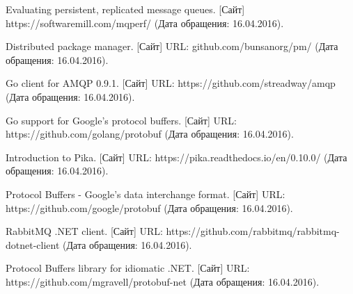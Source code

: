\begin{thebibliography}{9}
Evaluating persistent, replicated message queues. [Сайт] https://softwaremill.com/mqperf/ (Дата обращения: 16.04.2016).

Distributed package manager. [Сайт] URL: github.com/bunsanorg/pm/ (Дата обращения: 16.04.2016).

Go client for AMQP 0.9.1. [Сайт] URL: https://github.com/streadway/amqp (Дата обращения: 16.04.2016).

Go support for Google's protocol buffers. [Сайт] URL: https://github.com/golang/protobuf (Дата обращения: 16.04.2016).

Introduction to Pika. [Сайт] URL: https://pika.readthedocs.io/en/0.10.0/ (Дата обращения: 16.04.2016).

Protocol Buffers - Google's data interchange format. [Сайт] URL: https://github.com/google/protobuf (Дата обращения: 16.04.2016).

RabbitMQ .NET client. [Сайт] URL: https://github.com/rabbitmq/rabbitmq-dotnet-client (Дата обращения: 16.04.2016).

Protocol Buffers library for idiomatic .NET. [Сайт] URL: https://github.com/mgravell/protobuf-net (Дата обращения: 16.04.2016).

\end{thebibliography}
